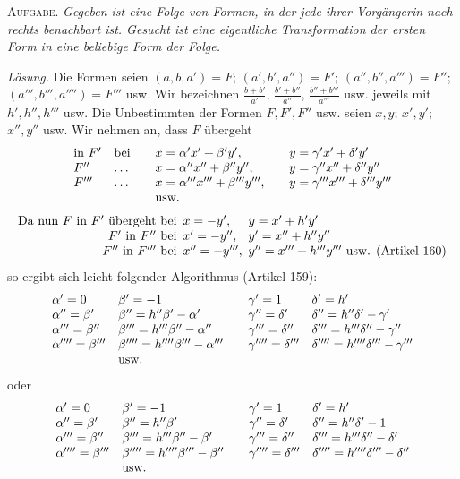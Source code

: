 \textsc{Aufgabe.} \emph{Gegeben ist eine Folge von Formen, in der jede ihrer Vorgängerin nach rechts benachbart ist. Gesucht ist eine eigentliche Transformation der ersten Form in eine beliebige Form der Folge.}

\emph{Lösung.} Die Formen seien $(a,b,a')=F$; $(a',b',a'')=F'$; $(a'',b'',a''')=F''$; $(a''',b''',a'''')=F'''$ usw. Wir bezeichnen $\frac{b+b'}{a'}$, $\frac{b'+b''}{a''}$, $\frac{b''+b'''}{a'''}$ usw. jeweils mit $h',h'',h'''$ usw. Die Unbestimmten der Formen $F,F',F''$ usw. seien $x,y$; $x',y'$; $x'',y''$ usw. Wir nehmen an, dass $F$ übergeht
\[
\begin{array}{ll@{\qquad}l@{\qquad}l}
\text{in }F'&\text{bei}&x=\alpha'x'+\beta'y',&y=\gamma'x'+\delta'y'\\
F''&\ldots&x=\alpha''x''+\beta''y'',&y=\gamma''x''+\delta''y''\\
F'''&\ldots&x=\alpha'''x'''+\beta'''y''',&y=\gamma'''x'''+\delta'''y'''\\
&&\text{usw.}&
\end{array}
\]
{\small\setlength{\arraycolsep}{3pt}
\[
\begin{array}{l@{\enspace}l@{\enspace}l}
\text{Da nun }F\text{ in }F'\text{ übergeht bei}&x=-y',&y=x'+h'y'\\
\hfill F'\text{ in }F''\text{ bei}&x'=-y'',&y'=x''+h''y''\\
\hfill F''\text{ in }F'''\text{ bei}&x''=-y''',&y''=x'''+h'''y'''\text{ usw. (Artikel\ 160)}
\end{array}
\]
}
so ergibt sich leicht folgender Algorithmus (Artikel 159):
\[
\begin{array}{ll@{\qquad}ll}
\alpha'=0&\beta'=-1&\gamma'=1&\delta'=h'\\
\alpha''=\beta'&\beta''=h''\beta'-\alpha'&\gamma''=\delta'&\delta''=h''\delta'-\gamma'\\
\alpha'''=\beta''&\beta'''=h'''\beta''-\alpha''&\gamma'''=\delta''&\delta'''=h'''\delta''-\gamma''\\
\alpha''''=\beta'''&\beta''''=h''''\beta'''-\alpha'''&\gamma''''=\delta'''&\delta''''=h''''\delta'''-\gamma'''\\
&\text{usw.}&&
\end{array}
\]
oder
\[
\begin{array}{ll@{\qquad}ll}
\alpha'=0&\beta'=-1&\gamma'=1&\delta'=h'\\
\alpha''=\beta'&\beta''=h''\beta'&\gamma''=\delta'&\delta''=h''\delta'-1\\
\alpha'''=\beta''&\beta'''=h'''\beta''-\beta'&\gamma'''=\delta''&\delta'''=h'''\delta''-\delta'\\
\alpha''''=\beta'''&\beta''''=h''''\beta'''-\beta''&\gamma''''=\delta'''&\delta''''=h''''\delta'''-\delta''\\
&\text{usw.}&&
\end{array}
\]

